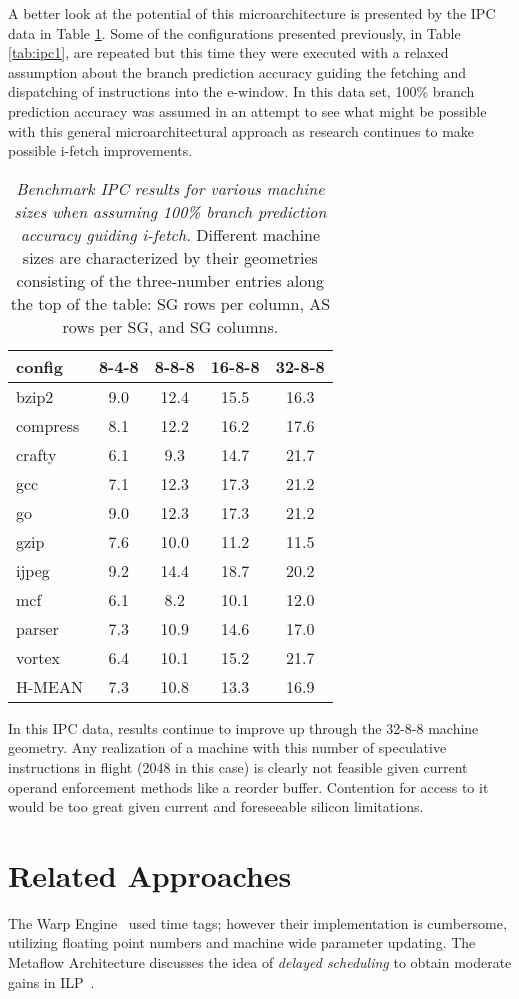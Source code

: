 \documentclass[10pt,dvips]{article}
\begin{document}
A better look at the potential of this microarchitecture is
presented by the IPC data in Table \ref{tab:ipc2}.
Some of the configurations presented previously, 
in Table \ref{tab:ipc1},
are repeated but this time they were executed with a relaxed
assumption about the branch prediction accuracy guiding the
fetching and dispatching of instructions into the e-window.
In this data set, 100\% branch prediction accuracy was
assumed in an attempt to see what might be possible with this
general microarchitectural approach as research continues to
make possible i-fetch improvements.
%
\begin{table}
\begin{center}
\caption{{\em Benchmark IPC results for various machine sizes
when assuming 100\% branch prediction accuracy guiding i-fetch.}
Different machine sizes are characterized by their
geometries consisting of the three-number entries along the
top of the table: SG rows per column, AS rows per SG, and
SG columns.}
\label{tab:ipc2}
\begin{tabular}{|l|c|c|c|c|}
\hline 
config&
8-4-8&8-8-8&16-8-8&32-8-8\\
\hline
\hline 
bzip2&9.0&12.4&15.5&16.3\\
\hline 
compress&8.1&12.2&16.2&17.6\\
\hline 
crafty&6.1&9.3&14.7&21.7\\
\hline 
gcc&7.1&12.3&17.3&21.2\\
\hline 
go&9.0&12.3&17.3&21.2\\
\hline 
gzip&7.6&10.0&11.2&11.5\\
\hline 
ijpeg&9.2&14.4&18.7&20.2\\
\hline 
mcf&6.1&8.2&10.1&12.0\\
\hline 
parser&7.3&10.9&14.6&17.0\\
\hline 
vortex&6.4&10.1&15.2&21.7\\
\hline 
\hline 
H-MEAN&7.3&10.8&13.3&16.9\\
\hline
\end{tabular}
\end{center}
\end{table}
%
In this IPC data, results continue to improve up through the
32-8-8 machine geometry.
Any realization of a machine with this number of speculative
instructions in flight (2048 in this case) is clearly not
feasible given current operand enforcement methods like
a reorder buffer.  Contention for access to it would be too great
given current and foreseeable silicon limitations.
%
%
\section{Related Approaches}
%
The Warp Engine~\cite{Cleary95} used time tags; however their implementation
is cumbersome, utilizing floating point numbers and machine wide parameter
updating.  The Metaflow Architecture discusses the 
idea of {\em delayed scheduling}
to obtain moderate gains in ILP~\cite{Pop}.
\end{document}
